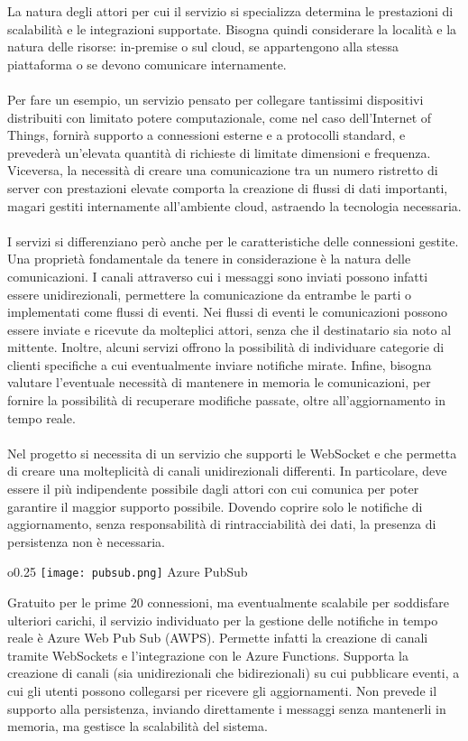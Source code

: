 La natura degli attori per cui il servizio si specializza 
determina le prestazioni di scalabilità e le integrazioni supportate. 
Bisogna quindi considerare la località e la natura delle risorse: in-premise o sul cloud, 
se appartengono alla stessa piattaforma o se devono comunicare internamente.\\
\\
Per fare un esempio, 
un servizio pensato per collegare tantissimi dispositivi distribuiti
con limitato potere computazionale, 
come nel caso dell'Internet of Things,
fornirà  supporto a connessioni esterne e a protocolli standard, 
e prevederà un'elevata quantità di richieste di limitate dimensioni e frequenza. 
Viceversa,
la necessità di creare una comunicazione 
tra un numero ristretto di server con prestazioni elevate 
comporta la creazione di flussi di dati importanti, 
magari gestiti internamente all'ambiente cloud, astraendo la tecnologia necessaria.\\
\\
I servizi si differenziano però anche per le caratteristiche delle connessioni gestite.
Una proprietà fondamentale da tenere in considerazione è la natura delle comunicazioni. 
I canali attraverso cui i messaggi sono inviati 
possono infatti essere unidirezionali, 
permettere la comunicazione da entrambe le parti o implementati come flussi di eventi.
Nei flussi di eventi le comunicazioni possono essere inviate e ricevute da molteplici attori, 
senza che il destinatario sia noto al mittente. 
Inoltre, alcuni servizi offrono la possibilità di individuare
categorie di clienti specifiche 
a cui eventualmente inviare notifiche mirate. 
Infine,
bisogna valutare l'eventuale necessità di mantenere in memoria le comunicazioni, 
per fornire la possibilità di recuperare modifiche passate,
oltre all'aggiornamento in tempo reale.\\
\\
Nel progetto si necessita di un servizio che supporti le WebSocket 
e che permetta di creare una molteplicità di canali unidirezionali differenti. 
In particolare, deve essere il più indipendente possibile dagli attori 
con cui comunica per poter garantire il maggior supporto possibile. 
Dovendo coprire solo le notifiche di aggiornamento, 
senza responsabilità di rintracciabilità dei dati, 
la presenza di persistenza non è necessaria.\\
\begin{wrapfigure}{o}{0.25\textwidth}
    \centering
    \texttt{[image: pubsub.png]}
    Azure PubSub
\end{wrapfigure}
Gratuito per le prime 20 connessioni, 
ma eventualmente scalabile per soddisfare ulteriori carichi, 
il servizio individuato per la gestione delle notifiche in tempo reale
è Azure Web Pub Sub (AWPS). 
Permette infatti la creazione di canali tramite WebSockets e
l'integrazione con le Azure Functions. 
Supporta la creazione di canali (sia unidirezionali che bidirezionali) su cui pubblicare eventi, 
a cui gli utenti possono collegarsi per ricevere gli aggiornamenti. 
Non prevede il supporto alla persistenza, 
inviando direttamente i messaggi senza mantenerli in memoria,
ma gestisce la scalabilità del sistema.

